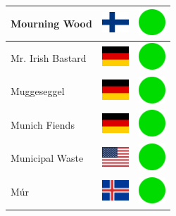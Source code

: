 \documentclass[12pt, a4paper, twoside]{report}
\begin{document}
\begin{center}
\begin{longtable}{|p{5cm}|p{2cm}|p{2cm}|}
 Mourning Wood                                              & \includegraphics[width=1cm]{../4x3/fi} &   \includegraphics[width=1cm]{../likes/y} \\ \hline
 Mr. Irish Bastard                                          & \includegraphics[width=1cm]{../4x3/de} &   \includegraphics[width=1cm]{../likes/y} \\ \hline
 Muggeseggel                                                & \includegraphics[width=1cm]{../4x3/de} &   \includegraphics[width=1cm]{../likes/y} \\ \hline
 Munich Fiends                                              & \includegraphics[width=1cm]{../4x3/de} &   \includegraphics[width=1cm]{../likes/y} \\ \hline
 Municipal Waste                                            & \includegraphics[width=1cm]{../4x3/us} &   \includegraphics[width=1cm]{../likes/y} \\ \hline
 Múr                                                        & \includegraphics[width=1cm]{../4x3/is} &   \includegraphics[width=1cm]{../likes/y} \\ \hline

\end{longtable}
\end{center}
\end{document}
